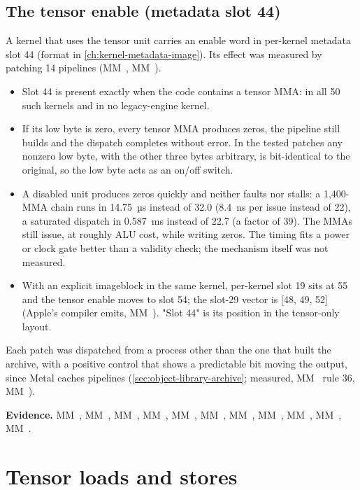 \subsection*{The tensor enable (metadata slot 44)}

A kernel that uses the tensor unit carries an enable word in per-kernel metadata slot 44 (format in
\cref{ch:kernel-metadata-image}). Its effect was measured by patching 14 pipelines (MM~, MM~).

\begin{itemize}
\item Slot 44 is present exactly when the code contains a tensor MMA: in all 50 such kernels and in no legacy-engine
  kernel.
\item If its low byte is zero, every tensor MMA produces zeros, the pipeline still builds and the dispatch completes
  without error. In the tested patches any nonzero low byte, with the other three bytes arbitrary, is bit-identical
  to the original, so the low byte acts as an on/off switch.
\item A disabled unit produces zeros quickly and neither faults nor stalls: a 1,400-MMA chain runs in 14.75~µs
  instead of 32.0 (8.4~ns per issue instead of 22), a saturated dispatch in 0.587~ms instead of 22.7 (a factor of 39).
  The MMAs still issue, at roughly ALU cost, while writing zeros. The timing fits a power or clock gate better than a
  validity check; the mechanism itself was not measured.
\item With an explicit imageblock in the same kernel, per-kernel slot 19 sits at 55 and the tensor enable moves to slot 54;
  the slot-29 vector is {[}48, 49, 52{]} (Apple's compiler emits, MM~). "Slot 44" is its position in the
  tensor-only layout.
\end{itemize}

Each patch was dispatched from a process other than the one that built the archive, with a positive control that
shows a predictable bit moving the output, since Metal caches pipelines (\cref{sec:object-library-archive}; measured,
MM~ rule 36, MM~).

\textbf{Evidence.} MM~, MM~, MM~, MM~, MM~, MM~, MM~, MM~, MM~,
MM~, MM~.

\section{Tensor loads and stores}\label{sec:tensor-memory-path}

